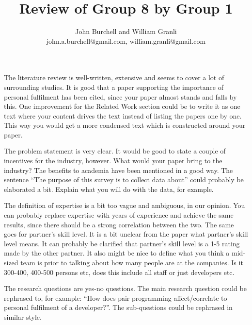 \documentclass[times, 10pt,twocolumn]{article}
\begin{document}
\title{Review of Group 8 by Group 1}

\author{John Burchell and William Granli \\
john.a.burchell@gmail.com, william.granli@gmail.com}



\maketitle
\thispagestyle{empty}







The literature review is well-written, extensive and seems to cover a lot of surrounding studies. It is good that a paper supporting the importance of personal fulfilment has been cited, since your paper almost stands and falls by this. One improvement for the Related Work section could be to write it as one text where your content drives the text instead of listing the papers one by one. This way you would get a more condensed text which is constructed around your paper. 

The problem statement is very clear. It would be good to state a couple of incentives for the industry, however. What would your paper bring to the industry? The benefits to academia have been mentioned in a good way. The sentence ``The purpose of this survey is to collect data about'' could probably be elaborated a bit. Explain what you will do with the data, for example. 

The definition of expertise is a bit too vague and ambiguous, in our opinion. You can probably replace expertise with years of experience and achieve the same results, since there should be a strong correlation between the two. The same goes for partner's skill level. It is a bit unclear from the paper what partner's skill level means. It can probably be clarified that partner's skill level is a 1-5 rating made by the other partner. It also might be nice to define what you think a mid-sized team is prior to talking about how many people are at the companies. Is it 300-400, 400-500 persons etc, does this include all staff or just developers etc.


The research questions are yes-no questions. The main research question could be rephrased to, for example: ``How does pair programming affect/correlate to personal fulfilment of a developer?''. The sub-questions could be rephrased in similar style. 
\end{document}
